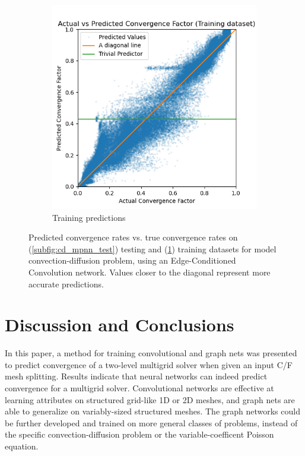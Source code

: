 \documentclass[review]{siamart190516}
\begin{document}
\begin{figure}[h]
\begin{subfigure}{.48\textwidth}
    \includegraphics[width=\textwidth]{figs/cd_var_conv_mpnn_train_pred.png}
    \caption{Training predictions}
    \label{subfig:cd_mpnn_train}
  \end{subfigure}
  \caption{Predicted convergence rates vs. true convergence rates on (\ref{subfig:cd_mpnn_test}) testing and (\ref{subfig:cd_mpnn_train}) training datasets for model convection-diffusion problem, using an Edge-Conditioned Convolution network. Values closer to the diagonal represent more accurate predictions.}
  \label{fig:cd_mpnn_pred}
\end{figure}

\section{Discussion and Conclusions}\label{sec:conc}


In this paper, a method for training convolutional and graph nets was presented to predict convergence of a two-level multigrid solver when given an input C/F mesh splitting.
Results indicate that neural networks can indeed predict convergence for a multigrid solver.  Convolutional networks are effective at learning attributes on structured grid-like 1D or 2D meshes, and graph nets are able to generalize on variably-sized structured meshes.  The graph networks could be further developed and trained on more general classes of problems, instead of the specific convection-diffusion problem or the variable-coefficent Poisson equation.
\end{document}
